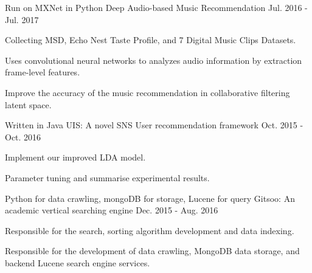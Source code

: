 \begin{cventries}
  \cventry
    {Run on MXNet in Python}
    {Deep Audio-based Music Recommendation}
    {}
    {Jul. 2016 - Jul. 2017}
    {
      \begin{cvitems}
        \item {Collecting MSD, Echo Nest Taste Profile, and 7 Digital Music Clips Datasets.}
        \item {Uses convolutional neural networks to analyzes audio information by extraction frame-level features.}
        \item {Improve the accuracy of the music recommendation in collaborative filtering latent space.}
      \end{cvitems}
    }
  \cventry
    {Written in Java}
    {UIS: A novel SNS User recommendation framework}
    {}
    {Oct. 2015 - Oct. 2016}
    {
      \begin{cvitems}
        \item {Implement our improved LDA model.}
        \item {Parameter tuning and summarise experimental results.}
      \end{cvitems}
    }
  \cventry
    {Python for data crawling, mongoDB for storage, Lucene for query}
    {Gitsoo: An academic vertical searching engine}
    {}
    {Dec. 2015 - Aug. 2016}
    {
      \begin{cvitems}
        \item {Responsible for the search, sorting algorithm development and data indexing.}
        \item {Responsible for the development of data crawling, MongoDB data storage, and backend Lucene search engine services.}
      \end{cvitems}
    }
\end{cventries}